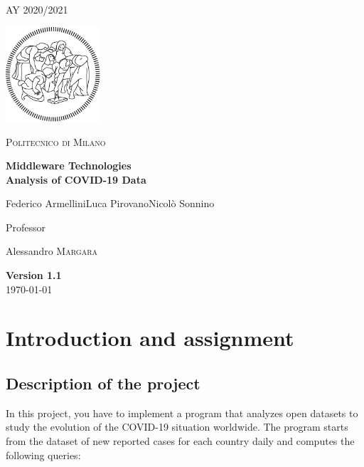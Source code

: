 \documentclass[table, 12pt]{article}
\begin{document}
\begin{titlepage}
		\centering
		{\scshape\large AY 2020/2021 \par}
		\vfill
		\includegraphics[width=100pt]{assets/logo-polimi-new}\par\vspace{1cm}
		{\scshape\LARGE Politecnico di Milano \par}
		\vspace{1.5cm}
		{\huge\bfseries Middleware Technologies\\Analysis of COVID-19 Data\par}
		\vspace{2cm}
		{\Large {Federico Armellini\quad Luca Pirovano\quad Nicolò Sonnino}\par}
		\vfill
		{\large Professor\par
			Alessandro \textsc{Margara}}
		\vfill
		{\large \textbf{Version 1.1}\\ \today \par}
	\end{titlepage}

	\thispagestyle{plain}
	\mbox{}
	\newpage
	\tableofcontents
	\newpage
	
	
\section{Introduction and assignment}
\subsection{Description of the project}
In this project, you have to implement a program that analyzes open datasets to study the evolution of the
COVID-19 situation worldwide. The program starts from the dataset of new reported cases for each country
daily and computes the following queries:
\end{document}
